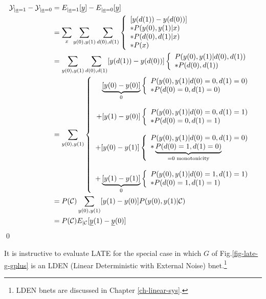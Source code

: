 \begin{align}
{\cal Y}_{|{\underline{a}}=1}-
{\cal Y}_{|{\underline{a}}=0}
&=
E_{|{\underline{a}}=1}[{\underline{y}}]
-
E_{|{\underline{a}}=0}[{\underline{y}}]
\\
&=
\sum_x
\sum_{y(0), y(1)}
\sum_{d(0), d(1)}
\left\{
\begin{array}{l}
[y(d(1))-y(d(0))]
\\
*P(y(0), y(1)|x)
\\
*P(d(0), d(1)|x)
\\
*P(x)
\end{array}
\right.
\\
&=
\sum_{y(0), y(1)}
\sum_{d(0), d(1)}
[y(d(1))-y(d(0))]
\left\{
\begin{array}{l}
P(y(0), y(1)|d(0), d(1))
\\
*P(d(0), d(1))
\end{array}
\right.
\\
&=
\sum_{y(0), y(1)}
\left\{
\begin{array}{r}
\underbrace{[y(0)-y(0)]}_{0}
\left\{
\begin{array}{l}
P(y(0), y(1)|d(0)=0, d(1)=0)
\\
*P(d(0)=0, d(1)=0)
\end{array}
\right.
\\
\\
+
[y(1)-y(0)]
\left\{
\begin{array}{l}
P(y(0), y(1)|d(0)=0, d(1)=1)
\\
*P(d(0)=0, d(1)=1)
\end{array}
\right.
\\
\\
+
[y(0)-y(1)]
\left\{
\begin{array}{l}
P(y(0), y(1)|d(0)=0, d(1)=0)
\\
*\underbrace{P(d(0)=1, d(1)=0)}
_{=0 \text{  monotonicity}}
\end{array}
\right.
\\
\\
+
\underbrace{[y(1)-y(1)]}_{0}
\left\{
\begin{array}{l}
P(y(0), y(1)|d(0)=1, d(1)=1)
\\
*P(d(0)=1, d(1)=1)
\end{array}
\right.
\end{array}
\right.
\\
&=
P({\cal C})
\sum_{y(0), y(1)}
[y(1)-y(0)]
P(y(0), y(1)|{\cal C})
\\
&=
P({\cal C})
E_{|{\cal C}}[{\underline{y}}(1)-{\underline{y}}(0)]
\end{align}
\qed

It
is instructive
to evaluate 
LATE for
the special case 
in which $G$
of
Fig.\ref{fig-late-g-gplus}
is an LDEN (Linear
Deterministic
with External
 Noise) bnet.\footnote{LDEN bnets are discussed in Chapter
 \ref{ch-linear-sys}.}
 
